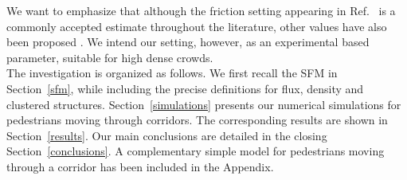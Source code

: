 We want to emphasize that although the friction setting appearing in 
Ref.~\cite{Helbing1} is a commonly accepted estimate throughout the  
literature, other values have also been proposed \cite{colombi2017}. We 
intend our setting, however, as an experimental based parameter, suitable for 
high dense crowds. \\

The investigation is organized as follows. We first recall the SFM in 
Section~\ref{sfm}, while including the precise definitions for flux, density 
and clustered structures. Section~\ref{simulations} presents our numerical 
simulations for pedestrians moving through corridors. The corresponding results 
are shown in Section~\ref{results}. Our main conclusions are detailed in the 
closing Section~\ref{conclusions}. A complementary simple model for pedestrians 
moving through a corridor has been included in the Appendix. \\     
